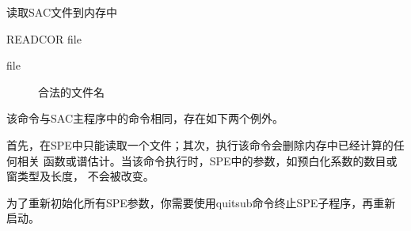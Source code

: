 \label{spe:readcor}

读取SAC文件到内存中

\begin{SACSTX}
READCOR file
\end{SACSTX}

\begin{description}
\item [file] 合法的文件名
\end{description}

该命令与SAC主程序中的命令相同，存在如下两个例外。

首先，在SPE中只能读取一个文件；其次，执行该命令会删除内存中已经计算的任何相关
函数或谱估计。当该命令执行时，SPE中的参数，如预白化系数的数目或窗类型及长度，
不会被改变。

为了重新初始化所有SPE参数，你需要使用quitsub命令终止SPE子程序，再重新启动。
